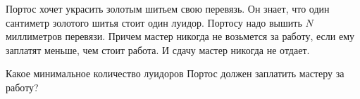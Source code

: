 Портос хочет украсить золотым шитьем свою перевязь. Он знает, что один сантиметр золотого шитья стоит один луидор. Портосу надо вышить $N$ миллиметров перевязи. Причем мастер никогда не возьмется за работу, если ему заплатят меньше, чем стоит работа. И сдачу мастер никогда не отдает.

Какое минимальное количество луидоров Портос должен заплатить мастеру за работу?